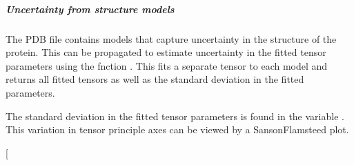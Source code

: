 \documentclass[a4paper,10pt,english,openany,oneside]{sphinxmanual}
\begin{document}
\subparagraph{Uncertainty from structure models}
\label{\detokenize{examples/pcs_fit_uncertainty:uncertainty-from-structure-models}}
\sphinxAtStartPar
The PDB file contains models that capture uncertainty in the structure of the protein. This can be propagated to estimate uncertainty in the fitted tensor parameters using the fnction . This fits a separate tensor to each model and returns all fitted tensors as well as the standard deviation in the fitted parameters.

\begin{sphinxVerbatim}[commandchars=\\\{\}]
\PYG{p}{[}\PYG{p}{]} \PYG{p}{[}\PYG{p}{]}   
	\PYG{p}{[}\PYG{p}{]} \PYG{p}{[}\PYG{p}{]}

\end{sphinxVerbatim}

\sphinxAtStartPar
The standard deviation in the fitted tensor parameters is found in the variable . This variation in tensor principle axes can be viewed by a Sanson\sphinxhyphen{}Flamsteed plot.

\sphinxAtStartPar
{} {[}\sphinxcode{\sphinxupquote{error\_tensor\_models.txt}}{]}
\end{document}
